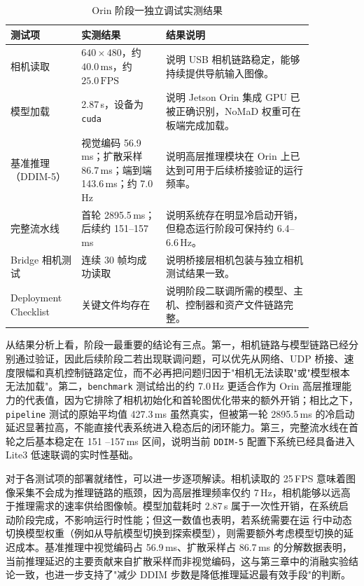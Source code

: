 \begin{table}[htbp]
    \centering
    \caption{Orin 阶段一独立调试实测结果}
    \label{tab:orin-stage1-results}
    \begin{tabular}{p{0.20\linewidth}p{0.24\linewidth}p{0.42\linewidth}}
        \toprule
        测试项 & 实测结果 & 结果说明 \\
        \midrule
        相机读取 & $640\times480$，约 $40.0\,\mathrm{ms}$，约 $25.0\,\mathrm{FPS}$ & 说明 USB
        相机链路稳定，能够持续提供导航输入图像。 \\
        模型加载 & 2.87\,s，设备为 \texttt{cuda} & 说明 Jetson Orin 集成 GPU 已被正确识别，NoMaD
        权重可在板端完成加载。 \\
        基准推理（DDIM-5） & 视觉编码 56.9\,ms；扩散采样 86.7\,ms；端到端 143.6\,ms；约 7.0\,Hz &
        说明高层推理模块在 Orin 上已达到可用于后续桥接验证的运行频率。 \\
        完整流水线 & 首轮 2895.5\,ms；后续约 151--157\,ms & 说明系统存在明显冷启动开销，但稳态运行阶段可保持约 6.4--
        6.6\,Hz。 \\
        Bridge 相机测试 & 连续 30 帧均成功读取 & 说明桥接层相机包装与独立相机测试结果一致。 \\
        Deployment Checklist & 关键文件均存在 & 说明阶段二联调所需的模型、主机、控制器和资产文件链路完整。 \\
        \bottomrule
    \end{tabular}
\end{table}

从结果分析上看，阶段一最重要的结论有三点。第一，相机链路与模型链路已经分别通过验证，因此后续阶段二若出现联调问题，可以优先从网络、UDP
桥接、速度限幅和真机控制链路定位，而不必再把问题归因于"相机无法读取"或"模型根本无法加载"。第二，\texttt{benchmark} 测试给出的约 7.0\,Hz
更适合作为 Orin 高层推理能力的代表值，因为它排除了相机初始化和首轮图优化带来的额外开销；相比之下，\texttt{pipeline} 测试的原始平均值
427.3\,ms 虽然真实，但被第一轮 2895.5\,ms 的冷启动延迟显著拉高，不能直接代表系统进入稳态后的闭环能力。第三，完整流水线在首轮之后基本稳定在 151
--157\,ms 区间，说明当前 \texttt{DDIM-5} 配置下系统已经具备进入 Lite3 低速联调的实时性基础。

对于各测试项的部署就绪性，可以进一步逐项解读。相机读取的 25\,FPS 意味着图像采集不会成为推理链路的瓶颈，因为高层推理频率仅约
7\,Hz，相机能够以远高于推理需求的速率供给图像帧。模型加载耗时 2.87\,s 属于一次性开销，在系统启动阶段完成，不影响运行时性能；但这一数值也表明，若系统需要在运
行中动态切换模型权重（例如从导航模型切换到探索模型），则需要额外考虑模型切换的延迟成本。基准推理中视觉编码占 56.9\,ms、扩散采样占 86.7\,ms
的分解数据表明，当前推理延迟的主要贡献来自扩散采样而非视觉编码，这与第三章中的消融实验结论一致，也进一步支持了"减少 DDIM 步数是降低推理延迟最有效手段"的判断。

